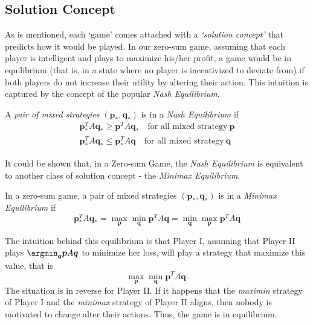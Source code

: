\documentclass[11pt,reqno, a4]{amsart}
\begin{document}
\subsection{Solution Concept}
As is mentioned, each `game' comes attached with a \textit{`solution concept'} that predicts how it would be played. In our zero-sum game, assuming that each player is intelligent and plays to maximize his/her profit, a game would be in equilibrium (that is, in a state where no player is incentivized to deviate from) if both players do not increase their utility by altering their action. This intuition is captured by the concept of the popular \textit{Nash Equilibrium}.
\begin{definition}
        A \textit{pair of mixed strategies} $(\bm{p}_*, \bm{q}_*)$ is in a \textit{Nash Equilibrium} if \begin{align*}
            \bm{p}_*^TA\bm{q_*} \geq \bm{p}^TA \bm{q}_* \quad \text{for all mixed strategy} \ \bm{p} \\
            \bm{p}_*^TA\bm{q_*} \leq \bm{p}_*^TA \bm{q} \quad \text{for all mixed strategy} \ \bm{q}
        \end{align*}
    \end{definition}
It could be shown that, in a Zero-sum Game, the \textit{Nash Equilibrium} is equivalent to another class of solution concept - the \textit{Minimax Equilibrium}.
\begin{definition}
        In a zero-sum game, a pair of mixed strategies $(\bm{p}_*, \bm{q}_*)$ is in a \textit{Minimax Equilibrium} if 
        \[
        \bm{p}^T_*A\bm{q}_* = \max_{\bm{p}}\min_{\bm{q}} \bm{p}^TA\bm{q} = \min_{\bm{q}}\max_{\bm{p}} \bm{p}^TA\bm{q}
        \]
    \end{definition}
\noindent The intuition behind this equilibrium is that Player I, assuming that Player II plays $\argmin_{\bm{q}} \bm{p}A\bm{q}$ to minimize her loss, will play a strategy that maximize this value, that is
\[
\max_{\bm{p}}\min_{\bm{q}}\bm{p}^TA\bm{q}.
\]
The situation is in reverse for Player II. If it happens that the \textit{maximin} strategy of Player I and the \textit{minimax} strategy of Player II aligns, then nobody is motivated to change alter their actions. Thus, the game is in equilibrium.
\end{document}

